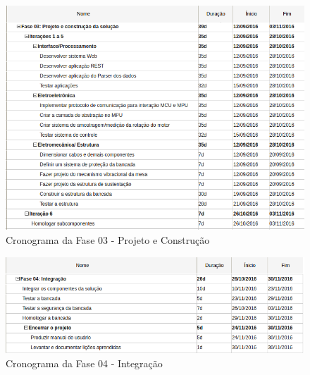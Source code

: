 \begin{figure}[!ht]
\centering
\includegraphics[scale=0.9]{figuras/cronograma_fase03.png}
\caption{Cronograma da Fase 03 - Projeto e Construção}
\end{figure}

\begin{figure}[!ht]
\centering
\includegraphics[scale=0.9]{figuras/cronograma_fase04.png}
\caption{Cronograma da Fase 04 - Integração}
\end{figure}

